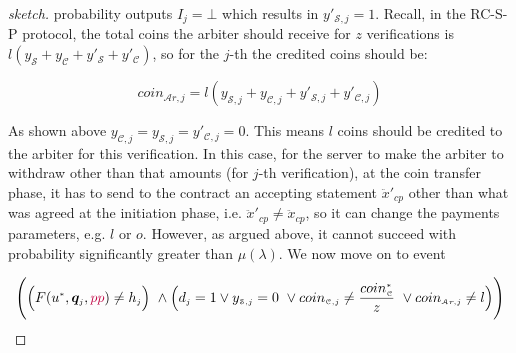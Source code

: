 \begin{proof}[sketch]
probability outputs $I_{\scriptscriptstyle j}=\bot$ which results in $y'_{\scriptscriptstyle\mathcal{S},j}=1$. Recall, in the RC-S-P protocol, the total coins the arbiter should receive for $z$ verifications is $l(y_{\scriptscriptstyle\mathcal S}+y_{\scriptscriptstyle\mathcal C}+y'_{\scriptscriptstyle\mathcal S}+y'_{\scriptscriptstyle\mathcal C})$, so for the $j$-th the credited coins should be: 
     
     
     \begin{equation}\label{equ::arbiter}
    coin_{\scriptscriptstyle\mathcal{A}r,j}= l(y_{\scriptscriptstyle\mathcal {S},j}+y_{\scriptscriptstyle\mathcal {C},j}+y'_{\scriptscriptstyle\mathcal {S},j}+y'_{\scriptscriptstyle\mathcal {C},j})
     \end{equation}

As shown above $y_{\scriptscriptstyle\mathcal{C},j}=y_{\scriptscriptstyle\mathcal{S},j}=y'_{\scriptscriptstyle\mathcal{C},j}=0$. This means $l$ coins should be credited to the arbiter for this verification.  In this case, for the server to make the arbiter to withdraw other than that amounts (for $j$-th verification), at the coin transfer phase, it has to send to the contract  an accepting  statement $\ddot{x}'_{\scriptscriptstyle cp}$ other than what was agreed at the initiation phase, i.e. $\ddot{x}'_{\scriptscriptstyle cp}\neq\ddot{x}_{\scriptscriptstyle cp}$, so it can change the payments parameters, e.g. $l$ or $o$. However, as argued above, it cannot succeed with probability significantly greater than $\mu(\lambda)$. We now move on to event 
     
     $$\Bigg(\Big(F(u^{\scriptscriptstyle *}, \bm{q}_{\scriptscriptstyle j}, \textcolor{purple}{pp})\neq h_{\scriptscriptstyle j}\Big) \ \wedge \Big(d_{\scriptscriptstyle j}=1	\vee y_{\scriptscriptstyle \mathcal {S},j}=0 \ \vee coin_{\scriptscriptstyle\mathcal{C},j}\neq \frac{coin_{\scriptscriptstyle\mathcal C}^{\scriptscriptstyle*}}{z} \ \vee  coin_{\scriptscriptstyle\mathcal{A}r,j}\neq l\Big)\Bigg)$$
     

\end{proof}
